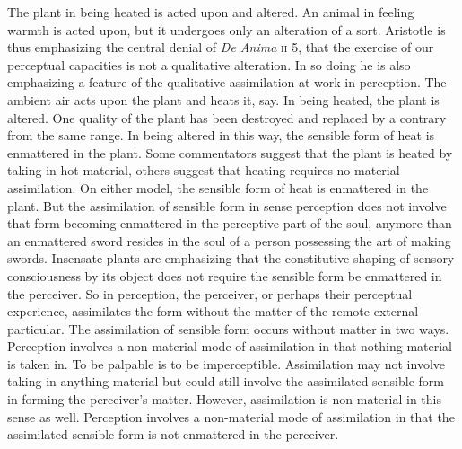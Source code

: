 The plant in being heated is acted upon and altered. An animal in feeling warmth is acted upon, but it undergoes only an alteration of a sort. Aristotle is thus emphasizing the central denial of \emph{De Anima} \textsc{ii} 5, that the exercise of our perceptual capacities is not a qualitative alteration. In so doing he is also emphasizing a feature of the qualitative assimilation at work in perception. The ambient air acts upon the plant and heats it, say. In being heated, the plant is altered. One quality of the plant has been destroyed and replaced by a contrary from the same range. In being altered in this way, the sensible form of heat is enmattered in the plant. Some commentators suggest that the plant is heated by taking in hot material, others suggest that heating requires no material assimilation. On either model, the sensible form of heat is enmattered in the plant. But the assimilation of sensible form in sense perception does not involve that form becoming enmattered in the perceptive part of the soul, anymore than an enmattered sword resides in the soul of a person possessing the art of making swords. Insensate plants are emphasizing that the constitutive shaping of sensory consciousness by its object does not require the sensible form be enmattered in the perceiver. So in perception, the perceiver, or perhaps their perceptual experience, assimilates the form without the matter of the remote external particular. The assimilation of sensible form occurs without matter in two ways. Perception involves a non-material mode of assimilation in that nothing material is taken in. To be palpable is to be imperceptible. Assimilation may not involve taking in anything material but could still involve the assimilated sensible form in-forming the perceiver's matter. However, assimilation is non-material in this sense as well. Perception involves a non-material mode of assimilation in that the assimilated sensible form is not enmattered in the perceiver.



